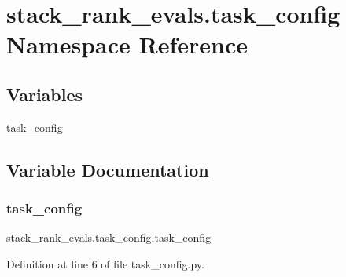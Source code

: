 \hypertarget{namespacestack__rank__evals_1_1task__config}{}\section{stack\+\_\+rank\+\_\+evals.\+task\+\_\+config Namespace Reference}
\label{namespacestack__rank__evals_1_1task__config}
\subsection*{Variables}
\begin{DoxyCompactItemize}
\item 
\hyperlink{namespacestack__rank__evals_1_1task__config_a9b5899c098ee8ba7dbf35ea12de0e248}{task\+\_\+config}
\end{DoxyCompactItemize}


\subsection{Variable Documentation}
\mbox{\label{namespacestack__rank__evals_1_1task__config_a9b5899c098ee8ba7dbf35ea12de0e248}} 
\subsubsection{\texorpdfstring{task\+\_\+config}{task\_config}}
{\footnotesize\ttfamily stack\+\_\+rank\+\_\+evals.\+task\+\_\+config.\+task\+\_\+config}



Definition at line 6 of file task\+\_\+config.\+py.

